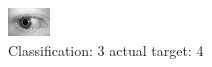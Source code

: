 \begin{figure}[h!]
\begin{center}
\includegraphics[width=0.60\columnwidth]{figures/ID762_class_3_target_4.png}
\end{center}
\caption{ Classification: 3 actual target: 4}
\label{fig:ID762_class_3_target_4}
\end{figure}
